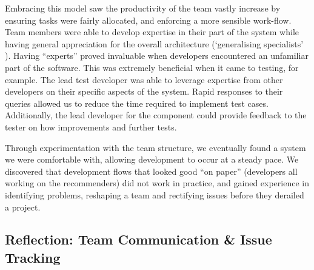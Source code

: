 \documentclass{l3proj}
\begin{document}
Embracing this model saw the productivity of the team vastly increase by ensuring tasks were fairly allocated, and enforcing a more sensible work-flow. Team members were able to develop expertise in their part of the system while having general appreciation for the overall architecture (`generalising specialists' \cite{AgileRoles}). Having “experts” proved invaluable when developers encountered an unfamiliar part of the software. This was extremely beneficial when it came to testing, for example. The lead test developer was able to leverage expertise from other developers on their specific aspects of the system. Rapid responses to their queries allowed us to reduce the time required to implement test cases. Additionally, the lead developer for the component could provide feedback to the tester on how improvements and further tests.

Through experimentation with the team structure, we eventually found a system we were comfortable with, allowing development to occur at a steady pace. We discovered that development flows that looked good “on paper” (developers all working on the recommenders) did not work in practice, and gained experience in identifying problems, reshaping a team and rectifying issues before they derailed a project. 

\subsection{Reflection: Team Communication \& Issue Tracking}
\label{sec:communication}




\end{document}
